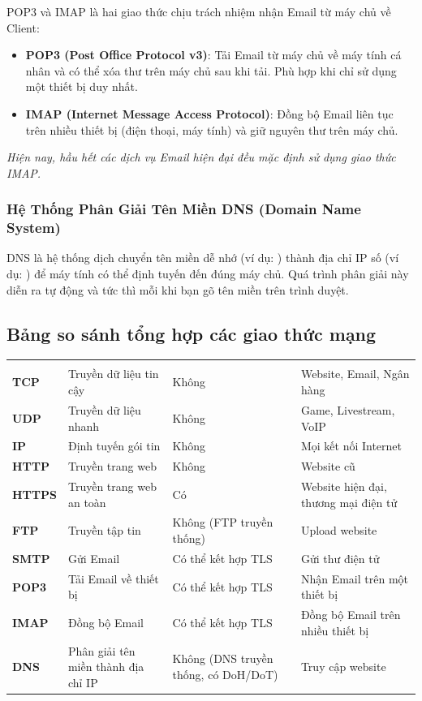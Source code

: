 POP3 và IMAP là hai giao thức chịu trách nhiệm nhận Email từ máy chủ về Client:
\begin{itemize}[leftmargin=1.8em, itemsep=2pt, parsep=0pt]
    \item \textbf{POP3 (Post Office Protocol v3)}: Tải Email từ máy chủ về máy tính cá nhân và có thể xóa thư trên máy chủ sau khi tải. Phù hợp khi chỉ sử dụng một thiết bị duy nhất.
    \item \textbf{IMAP (Internet Message Access Protocol)}: Đồng bộ Email liên tục trên nhiều thiết bị (điện thoại, máy tính) và giữ nguyên thư trên máy chủ.
\end{itemize}
\textit{Hiện nay, hầu hết các dịch vụ Email hiện đại đều mặc định sử dụng giao thức IMAP.}

\subsubsection{Hệ Thống Phân Giải Tên Miền DNS (Domain Name System)}

DNS là hệ thống dịch chuyển tên miền dễ nhớ (ví dụ: ) thành địa chỉ IP số (ví dụ: ) để máy tính có thể định tuyến đến đúng máy chủ. Quá trình phân giải này diễn ra tự động và tức thì mỗi khi bạn gõ tên miền trên trình duyệt.

\subsection{Bảng so sánh tổng hợp các giao thức mạng}

\begin{prettyTableBox}
\begin{tabularx}{\linewidth}{>{\bfseries\color{primaryBlue}}C{1.8cm} Z C{2.2cm} Z}
 &  &  &  \\
TCP & Truyền dữ liệu tin cậy & Không & Website, Email, Ngân hàng \\
UDP & Truyền dữ liệu nhanh & Không & Game, Livestream, VoIP \\
IP & Định tuyến gói tin & Không & Mọi kết nối Internet \\
HTTP & Truyền trang web & Không & Website cũ \\
HTTPS & Truyền trang web an toàn & Có & Website hiện đại, thương mại điện tử \\
FTP & Truyền tập tin & Không (FTP truyền thống) & Upload website \\
SMTP & Gửi Email & Có thể kết hợp TLS & Gửi thư điện tử \\
POP3 & Tải Email về thiết bị & Có thể kết hợp TLS & Nhận Email trên một thiết bị \\
IMAP & Đồng bộ Email & Có thể kết hợp TLS & Đồng bộ Email trên nhiều thiết bị \\
DNS & Phân giải tên miền thành địa chỉ IP & Không (DNS truyền thống, có DoH/DoT) & Truy cập website \\
\end{tabularx}
\end{prettyTableBox}

